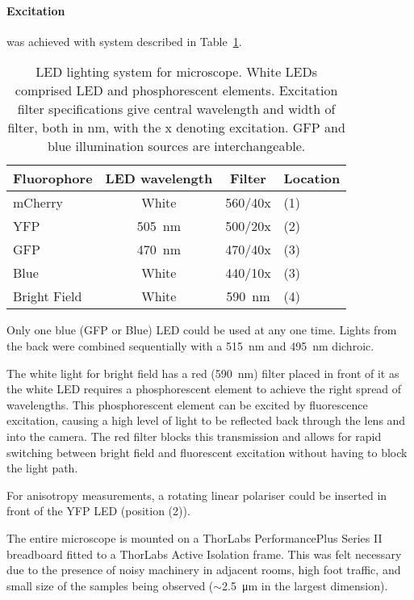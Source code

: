 \documentclass[../main.tex]{subfiles}
\begin{document}
\paragraph{Excitation} was achieved with system described in Table~\ref{table:ledlighting}.
\begin{table}[h!]
\begin{center}
\begin{tabular}{l|c|c|l}
\textbf{Fluorophore}	&	\textbf{LED wavelength}	&	\textbf{Filter}	&	\textbf{Location} \\\hline
mCherry	&	White	&	560/40x	&	(1)	\\
YFP		&	\SI{505}{\nano\meter}		&	500/20x	&	(2)\\
GFP		&	\SI{470}{\nano\meter}		&	470/40x	&	(3)\\
Blue		&	White	&	440/10x	&	(3)\\
Bright Field		&	White	&	\SI{590}{\nano\meter}	&	(4)
\end{tabular}
\caption[LED lighting system]{LED lighting system for microscope. White LEDs comprised LED and phosphorescent elements. Excitation filter specifications give central wavelength and width of filter, both in \si{\nano\meter}, with the x denoting excitation. GFP and blue illumination sources are interchangeable.}
\label{table:ledlighting}
\end{center}
\end{table}

Only one blue (GFP or Blue) LED could be used at any one time. Lights from the back were combined sequentially with a \SI{515}{\nano\meter} and \SI{495}{\nano\meter} dichroic.

The white light for bright field has a red (\SI{590}{\nano\meter}) filter placed in front of it as the white LED requires a phosphorescent element to achieve the right spread of wavelengths. This phosphorescent element can be excited by fluorescence excitation, causing a high level of light to be reflected back through the lens and into the camera. The red filter blocks this transmission and allows for rapid switching between bright field and fluorescent excitation without having to block the light path.

For anisotropy measurements, a rotating linear polariser could be inserted in front of the YFP LED (position (2)).

The entire microscope is mounted on a ThorLabs PerformancePlus Series II breadboard fitted to a ThorLabs Active Isolation frame. This was felt necessary due to the presence of noisy machinery in adjacent rooms, high foot traffic, and small size of the samples being observed (\(\sim\)\SI{2.5}{\micro\meter} in the largest dimension).
\end{document}
